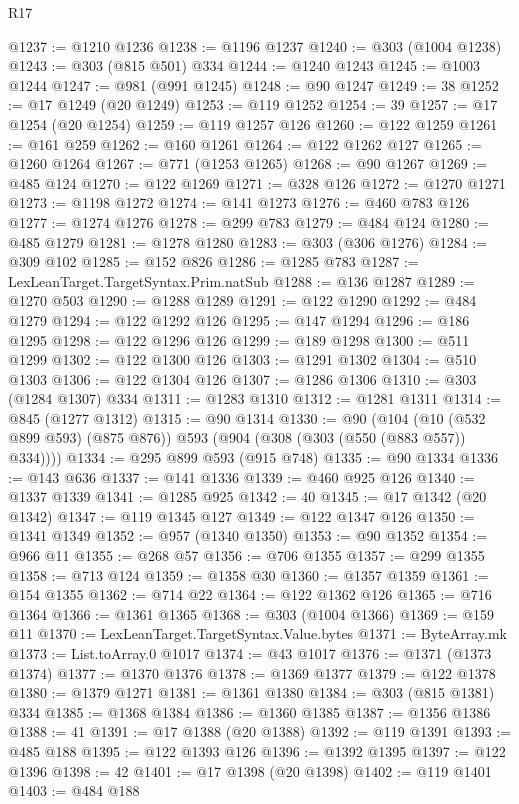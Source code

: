 \begin{lexlean}{R17}
\begin{coremodule}
@1237 := @1210 @1236
@1238 := @1196 @1237
@1240 := @303 (@1004 @1238)
@1243 := @303 (@815 @501) @334
@1244 := @1240 @1243
@1245 := @1003 @1244
@1247 := @981 (@991 @1245)
@1248 := @90 @1247
@1249 := 38
@1252 := @17 @1249 (@20 @1249)
@1253 := @119 @1252
@1254 := 39
@1257 := @17 @1254 (@20 @1254)
@1259 := @119 @1257 @126
@1260 := @122 @1259
@1261 := @161 @259
@1262 := @160 @1261
@1264 := @122 @1262 @127
@1265 := @1260 @1264
@1267 := @771 (@1253 @1265)
@1268 := @90 @1267
@1269 := @485 @124
@1270 := @122 @1269
@1271 := @328 @126
@1272 := @1270 @1271
@1273 := @1198 @1272
@1274 := @141 @1273
@1276 := @460 @783 @126
@1277 := @1274 @1276
@1278 := @299 @783
@1279 := @484 @124
@1280 := @485 @1279
@1281 := @1278 @1280
@1283 := @303 (@306 @1276)
@1284 := @309 @102
@1285 := @152 @826
@1286 := @1285 @783
@1287 := LexLeanTarget.TargetSyntax.Prim.natSub
@1288 := @136 @1287
@1289 := @1270 @503
@1290 := @1288 @1289
@1291 := @122 @1290
@1292 := @484 @1279
@1294 := @122 @1292 @126
@1295 := @147 @1294
@1296 := @186 @1295
@1298 := @122 @1296 @126
@1299 := @189 @1298
@1300 := @511 @1299
@1302 := @122 @1300 @126
@1303 := @1291 @1302
@1304 := @510 @1303
@1306 := @122 @1304 @126
@1307 := @1286 @1306
@1310 := @303 (@1284 @1307) @334
@1311 := @1283 @1310
@1312 := @1281 @1311
@1314 := @845 (@1277 @1312)
@1315 := @90 @1314
@1330 := @90
    (@104 (@10 (@532 @899 @593) (@875 @876)) @593 (@904 (@308 (@303 (@550 (@883 @557)) @334))))
@1334 := @295 @899 @593 (@915 @748)
@1335 := @90 @1334
@1336 := @143 @636
@1337 := @141 @1336
@1339 := @460 @925 @126
@1340 := @1337 @1339
@1341 := @1285 @925
@1342 := 40
@1345 := @17 @1342 (@20 @1342)
@1347 := @119 @1345 @127
@1349 := @122 @1347 @126
@1350 := @1341 @1349
@1352 := @957 (@1340 @1350)
@1353 := @90 @1352
@1354 := @966 @11
@1355 := @268 @57
@1356 := @706 @1355
@1357 := @299 @1355
@1358 := @713 @124
@1359 := @1358 @30
@1360 := @1357 @1359
@1361 := @154 @1355
@1362 := @714 @22
@1364 := @122 @1362 @126
@1365 := @716 @1364
@1366 := @1361 @1365
@1368 := @303 (@1004 @1366)
@1369 := @159 @11
@1370 := LexLeanTarget.TargetSyntax.Value.bytes
@1371 := ByteArray.mk
@1373 := List.toArray.{0} @1017
@1374 := @43 @1017
@1376 := @1371 (@1373 @1374)
@1377 := @1370 @1376
@1378 := @1369 @1377
@1379 := @122 @1378
@1380 := @1379 @1271
@1381 := @1361 @1380
@1384 := @303 (@815 @1381) @334
@1385 := @1368 @1384
@1386 := @1360 @1385
@1387 := @1356 @1386
@1388 := 41
@1391 := @17 @1388 (@20 @1388)
@1392 := @119 @1391
@1393 := @485 @188
@1395 := @122 @1393 @126
@1396 := @1392 @1395
@1397 := @122 @1396
@1398 := 42
@1401 := @17 @1398 (@20 @1398)
@1402 := @119 @1401
@1403 := @484 @188

\end{coremodule}
\end{lexlean}

